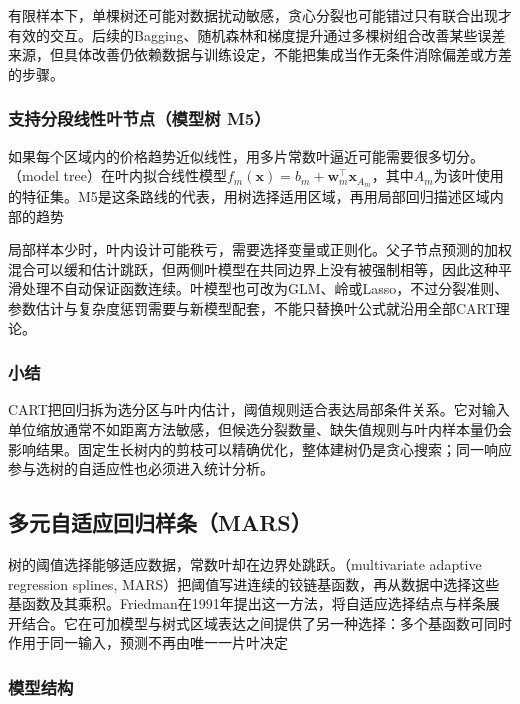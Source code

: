 有限样本下，单棵树还可能对数据扰动敏感，贪心分裂也可能错过只有联合出现才有效的交互。后续的Bagging、随机森林和梯度提升通过多棵树组合改善某些误差来源，但具体改善仍依赖数据与训练设定，不能把集成当作无条件消除偏差或方差的步骤。

\subsubsection{支持分段线性叶节点（模型树 M5）}
\label{sec:regression-model-tree}

如果每个区域内的价格趋势近似线性，用多片常数叶逼近可能需要很多切分。（model tree）在叶内拟合线性模型$f_m(\bm{x})=b_m+\bm{w}_m^{\top}\bm{x}_{A_m}$，其中$A_m$为该叶使用的特征集。M5是这条路线的代表，用树选择适用区域，再用局部回归描述区域内部的趋势

局部样本少时，叶内设计可能秩亏，需要选择变量或正则化。父子节点预测的加权混合可以缓和估计跳跃，但两侧叶模型在共同边界上没有被强制相等，因此这种平滑处理不自动保证函数连续。叶模型也可改为GLM、岭或Lasso，不过分裂准则、参数估计与复杂度惩罚需要与新模型配套，不能只替换叶公式就沿用全部CART理论。

\subsubsection{小结}

CART把回归拆为选分区与叶内估计，阈值规则适合表达局部条件关系。它对输入单位缩放通常不如距离方法敏感，但候选分裂数量、缺失值规则与叶内样本量仍会影响结果。固定生长树内的剪枝可以精确优化，整体建树仍是贪心搜索；同一响应参与选树的自适应性也必须进入统计分析。

\subsection{多元自适应回归样条（MARS）}
\label{sec:regression-mars}

树的阈值选择能够适应数据，常数叶却在边界处跳跃。（multivariate adaptive regression splines, MARS）把阈值写进连续的铰链基函数，再从数据中选择这些基函数及其乘积。Friedman在1991年提出这一方法，将自适应选择结点与样条展开结合。它在可加模型与树式区域表达之间提供了另一种选择：多个基函数可同时作用于同一输入，预测不再由唯一一片叶决定

\subsubsection{模型结构}

